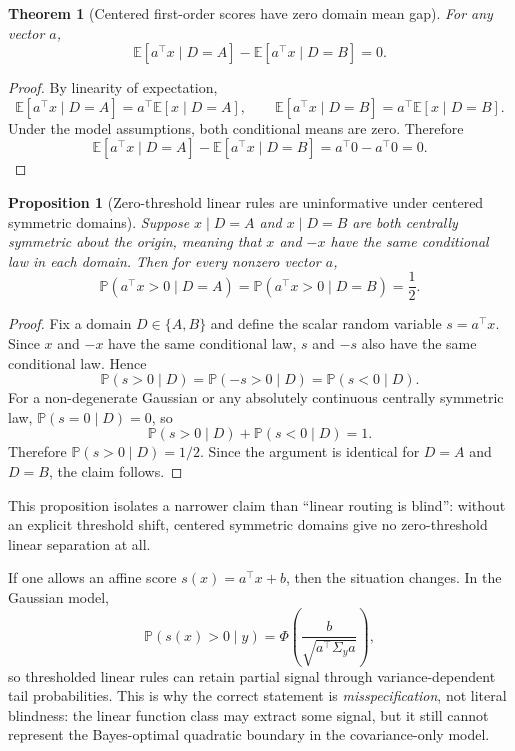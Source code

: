 \documentclass[11pt]{article}
\newtheorem{theorem}{Theorem}
\newtheorem{proposition}{Proposition}
\begin{document}
\begin{theorem}[Centered first-order scores have zero domain mean gap]
For any vector $a$,
\[
\mathbb{E}[a^\top x \mid D=A] - \mathbb{E}[a^\top x \mid D=B] = 0.
\]
\end{theorem}

\begin{proof}
By linearity of expectation,
\[
\mathbb{E}[a^\top x\mid D=A]
=
a^\top \mathbb{E}[x\mid D=A],
\qquad
\mathbb{E}[a^\top x\mid D=B]
=
a^\top \mathbb{E}[x\mid D=B].
\]
Under the model assumptions, both conditional means are zero. Therefore
\[
\mathbb{E}[a^\top x \mid D=A] - \mathbb{E}[a^\top x \mid D=B]
=
a^\top 0-a^\top 0
=
0.
\]
\end{proof}

\begin{proposition}[Zero-threshold linear rules are uninformative under centered symmetric domains]
Suppose $x\mid D=A$ and $x\mid D=B$ are both centrally symmetric about the origin, meaning that $x$ and $-x$ have the same conditional law in each domain. Then for every nonzero vector $a$,
\[
\mathbb P(a^\top x>0\mid D=A)
=
\mathbb P(a^\top x>0\mid D=B)
=
\frac12.
\]
\end{proposition}

\begin{proof}
Fix a domain $D\in\{A,B\}$ and define the scalar random variable $s=a^\top x$. Since $x$ and $-x$ have the same conditional law, $s$ and $-s$ also have the same conditional law. Hence
\[
\mathbb P(s>0\mid D)=\mathbb P(-s>0\mid D)=\mathbb P(s<0\mid D).
\]
For a non-degenerate Gaussian or any absolutely continuous centrally symmetric law, $\mathbb P(s=0\mid D)=0$, so
\[
\mathbb P(s>0\mid D)+\mathbb P(s<0\mid D)=1.
\]
Therefore $\mathbb P(s>0\mid D)=1/2$. Since the argument is identical for $D=A$ and $D=B$, the claim follows.
\end{proof}

This proposition isolates a narrower claim than ``linear routing is blind'': without an explicit threshold shift, centered symmetric domains give no zero-threshold linear separation at all.

If one allows an affine score $s(x)=a^\top x+b$, then the situation changes. In the Gaussian model,
\[
\mathbb P(s(x)>0\mid y)
=
\Phi\!\left(\frac{b}{\sqrt{a^\top\Sigma_y a}}\right),
\]
so thresholded linear rules can retain partial signal through variance-dependent tail probabilities. This is why the correct statement is \emph{misspecification}, not literal blindness: the linear function class may extract some signal, but it still cannot represent the Bayes-optimal quadratic boundary in the covariance-only model.
\end{document}
